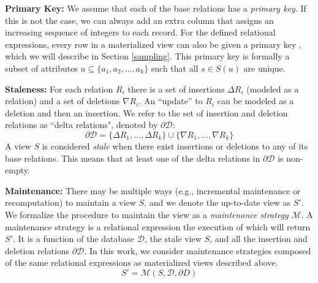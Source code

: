 \noindent \textbf{Primary Key:} We assume that each of the base relations has a \emph{primary key}. If this is not the case, we can always add an extra column 
that assigns an increasing sequence of integers to each record.
For the defined relational expressions, every row in a materialized view can also be given a primary key \cite{DBLP:journals/vldb/CuiW03, DBLP:conf/sigmod/ZengGMZ14},
which we will describe in Section \ref{sampling}. 
This primary key is formally a subset of attributes $u \subseteq \{a_1,a_2,...,a_k\}$ such that all $s \in S(u)$ are unique.

\vspace{.25em}

\noindent \textbf{Staleness:} For each relation $R_i$ there is a set of insertions $\Delta R_i$ (modeled as a relation)
and a set of deletions $\nabla R_i$.
An ``update'' to $R_i$ can be modeled as a deletion and then an insertion.
We refer to the set of insertion and deletion relations as ``delta relations", denoted by $\partial \mathcal{D}$:
\[
	\partial \mathcal{D} = \{\Delta R_1,...,\Delta R_k\} \cup \{\nabla R_1,...,\nabla R_k\}
\]
A view $S$ is considered \emph{stale} when there exist insertions or deletions to any of its base relations.
This means that at least one of the delta relations in $\partial \mathcal{D}$ is non-empty.

\vspace{.25em}

\noindent \textbf{Maintenance:} There may be multiple ways (e.g., incremental maintenance or recomputation) to maintain a view $S$, and we denote the up-to-date view as $S'$.
We formalize the procedure to maintain the view as a \emph{maintenance strategy} $\mathcal{M}$.
A maintenance strategy is a relational expression the execution of which will return $S'$.
It is a function of the database $\mathcal{D}$, the stale view $S$, and all the insertion and deletion relations $\partial \mathcal{D}$. 
In this work, we consider maintenance strategies composed of the same relational expressions as materialized views described above.
\[
S' = \mathcal{M}(S,\mathcal{D}, \partial D)
\]

\vspace{.25em}

